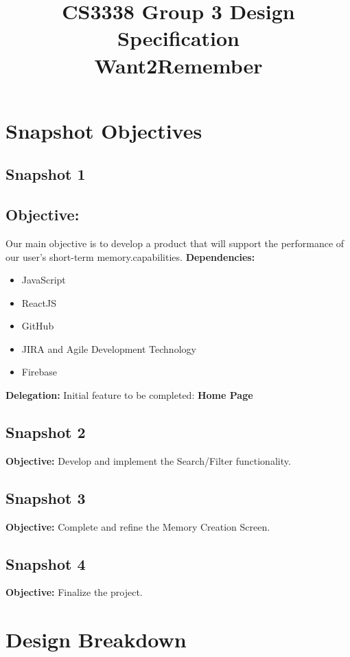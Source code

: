 \documentclass[12pt]{article}
\title{CS3338 Group 3 Design Specification\\\textbf{Want2Remember}}
\author{}
\date{}
\begin{document}
\maketitle
\thispagestyle{empty}
\newpage

\tableofcontents
\newpage

\section{Snapshot Objectives}

\subsection{Snapshot 1}
\subsection{Objective:} Our main objective is to develop a product that will support the performance of our user's short-term memory.capabilities.\newline
\textbf{Dependencies:}
\begin{itemize}
    \item JavaScript
    \item ReactJS
    \item GitHub
    \item JIRA and Agile Development Technology
    \item Firebase
\end{itemize}
\textbf{Delegation:} Initial feature to be completed: \textbf{Home Page}

\subsection{Snapshot 2}
\textbf{Objective:} Develop and implement the Search/Filter functionality. 

\subsection{Snapshot 3}
\textbf{Objective:} Complete and refine the Memory Creation Screen. 
\subsection{Snapshot 4}
\textbf{Objective:} Finalize the project.

\section{Design Breakdown}
\end{document}
